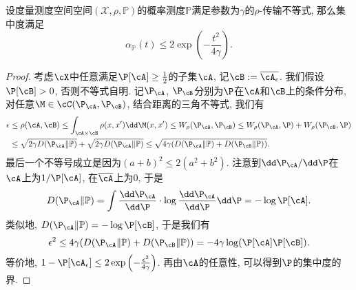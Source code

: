 \begin{theorem}[从传输成本到集中度]
	设度量测度空间空间$(\mathcal{X}, \rho, \mathbb{P})$的概率测度$\mathbb{P}$满足参数为$\gamma$的$\rho$-传输不等式, 那么集中度满足
	\begin{equation*}
		\alpha_{\mathbb{P}}(t)
		\leq 2 \exp \left(- \frac{t^2}{4 \gamma} \right). 
	\end{equation*}
\end{theorem}
\begin{proof}
	考虑$\cX$中任意满足$\P[\cA] \geq \frac{1}{2}$的子集$\cA$, 记$\cB := \overline{\cA_{\epsilon}}$. 
	我们假设$\P[\cB] > 0$, 否则不等式自明. 
	记$\P_{\cA}$, $\P_{\cB}$分别为$\P$在$\cA$和$\cB$上的条件分布, 对任意$\M \in \cC(\P_{\cA}, \P_{\cB})$, 结合距离的三角不等式, 我们有
	\begin{align*}
		\epsilon
		& \leq \rho(\cA, \cB)
		\leq \int_{\cA \times \cB} \rho(x, x') \dd \M(x, x')
		\leq W_{\rho}(\P_{\cA}, \P_{\cB}) 
		\leq W_{\rho}(\P_{\cA}, \P) + W_{\rho}(\P_{\cB}, \P) \\
		& \leq \sqrt{2 \gamma D(\P_{\cA} \| \mathbb{P})} + \sqrt{2 \gamma D(\P_{\cA} \| \mathbb{P})} 
		\leq \sqrt{4 \gamma (D(\P_{\cA} \| \mathbb{P}) + D(\P_{\cB} \| \mathbb{P}))}. 
	\end{align*}
	最后一个不等号成立是因为$(a+b)^2 \leq 2 (a^2 + b^2)$. 
	注意到$\dd \P_{\cA} / \dd \P$在$\cA$上为$1 / \P[\cA]$, 在$\overline{\cA}$上为$0$, 于是
	\begin{equation*}
		D(\P_{\cA} \| \mathbb{P})
		= \int \frac{\dd \P_{\cA}}{\dd \P}  \cdot \log \frac{\dd \P_{\cA}}{\dd \P} \dd \P 
		= - \log \P[\cA]. 
	\end{equation*}
	类似地, $D(\P_{\cA} \| \mathbb{P}) = - \log \P[\cB]$, 于是我们有
	\begin{equation*}
		\epsilon^2 
		\leq 4 \gamma (D(\P_{\cA} \| \mathbb{P}) + D(\P_{\cB} \| \mathbb{P}))
		= - 4 \gamma \log (\P[\cA] \P[\cB]). 
	\end{equation*}
	等价地, $1 - \P[\cA_{\epsilon}] \leq 2 \exp \left( -\frac{\epsilon^2}{4 \gamma} \right)$. 
	再由$\cA$的任意性, 可以得到$\P$的集中度的界. 
	
	
\end{proof}


